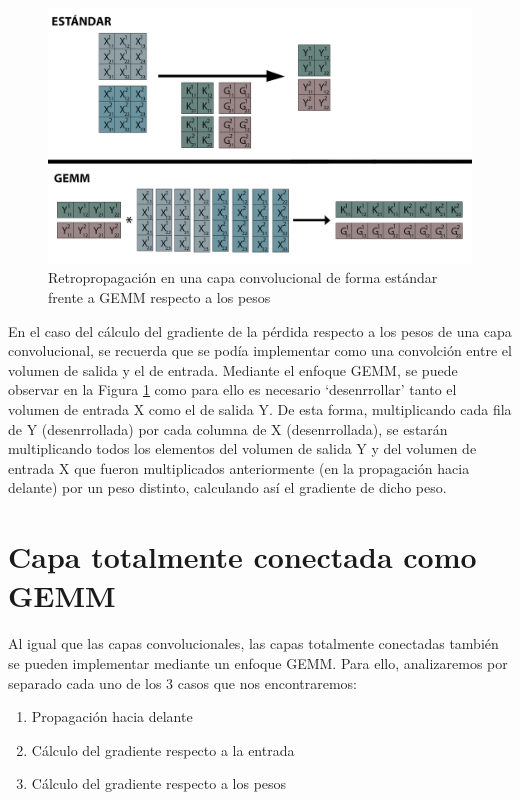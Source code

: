 \begin{figure}[H]
	\includegraphics[scale=0.33]{imagenes/conv_std_vs_gemm_backprop_pesos.jpg}  
	\caption{Retropropagación en una capa convolucional de forma estándar frente a GEMM respecto a los pesos}
	\label{fig:conv_std_vs_gemm_backprop_pesos}
\end{figure}

En el caso del cálculo del gradiente de la pérdida respecto a los pesos de una capa convolucional, se recuerda que se podía implementar como una convolción entre el volumen de salida y el de entrada. Mediante el enfoque GEMM, se puede observar en la Figura \ref{fig:conv_std_vs_gemm_backprop_pesos} como para ello es necesario `desenrrollar' tanto el volumen de entrada X como el de salida Y. De esta forma, multiplicando cada fila de Y (desenrrollada) por cada columna de X (desenrrollada), se estarán multiplicando todos los elementos del volumen de salida Y y del volumen de entrada X que fueron multiplicados anteriormente (en la propagación hacia delante) por un peso distinto, calculando así el gradiente de dicho peso.




\section{Capa totalmente conectada como GEMM \cite{nvidia_back_fully_GEMM}}

Al igual que las capas convolucionales, las capas totalmente conectadas también se pueden implementar mediante un enfoque GEMM. Para ello, analizaremos por separado cada uno de los 3 casos que nos encontraremos:
\begin{enumerate}[label=\textbullet, nosep]
	\item Propagación hacia delante
	\item Cálculo del gradiente respecto a la entrada
	\item Cálculo del gradiente respecto a los pesos
\end{enumerate}

